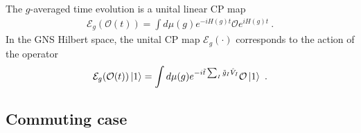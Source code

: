 \documentclass{article}
\theoremstyle{definition}
\newcommand{\mO}{\mathcal{O}}
\begin{document}
    The $g$-averaged time evolution is a unital linear CP map
    \begin{eqnarray}
        \mathcal{E}_g(\mO(t))=\int d\mu(g) e^{-i H(g) t}\mO e^{i H(g) t}\ .
    \end{eqnarray}
    In the GNS Hilbert space, the unital CP map $\mathcal{E}_{g}(\cdot)$
    corresponds to the action of the operator
    \begin{eqnarray}
        \mathcal{E}_g(\mO(t))\ket{1}=\int d\mu(g) e^{-i \tilde{t}\sum_I \tilde{g}_I\hat{V}_I }\mO\ket{1}\ .
    \end{eqnarray}

    \subsection{Commuting case}
\end{document}
